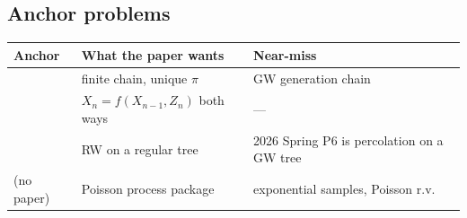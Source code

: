 \subsection{Anchor problems}

{\footnotesize
\begin{center}
\begin{tabular}{@{}L{2.7cm}L{5.4cm}L{6.1cm}@{}}
\toprule
Anchor & What the paper wants & Near-miss \\
\midrule
{} & finite chain, unique \(\pi\) & GW generation chain \\
 & \(X_{n}=f(X_{n-1},Z_{n})\) both ways & --- \\
 & RW on a regular tree & 2026 Spring P6 is percolation on a GW tree \\
(no paper) & Poisson process package & exponential samples, Poisson r.v.\ \\
\bottomrule
\end{tabular}
\end{center}
}
